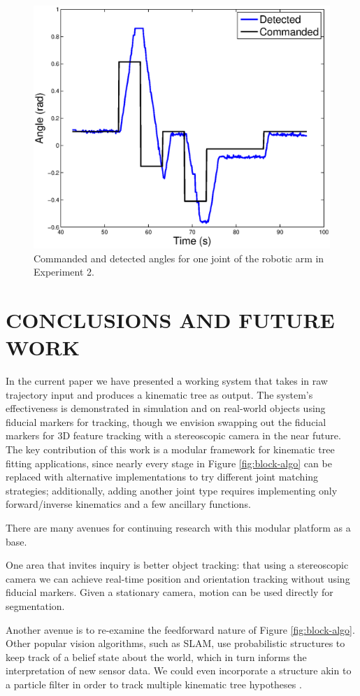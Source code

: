 \documentclass[letterpaper, 10 pt, conference]{ieeeconf}  %
\begin{document}
\begin{figure}[ht]
  \centering
  \includegraphics[width=.4\textwidth]{img/exp2b.eps}
  \vspace{-.1in}
  \caption{Commanded and detected angles for one joint of the robotic arm in Experiment 2.}
  \label{fig:exp2}
\end{figure}

\section{CONCLUSIONS AND FUTURE WORK} \label{sec:conclusion}\label{sec:future}

In the current paper we have presented a working system that takes in raw trajectory input and produces a kinematic tree as output. The system's effectiveness is demonstrated in simulation and on real-world objects using fiducial markers for tracking, though we envision swapping out the fiducial markers for 3D feature tracking with a stereoscopic camera in the near future. The key contribution of this work is a modular framework for kinematic tree fitting applications, since nearly every stage in Figure \ref{fig:block-algo} can be replaced with alternative implementations to try different joint matching strategies; additionally, adding another joint type requires implementing only forward/inverse kinematics and a few ancillary functions.

There are many avenues for continuing research with this modular platform as a base. 

One area that invites inquiry is better object tracking: that using a stereoscopic camera we can achieve real-time position and orientation tracking without using fiducial markers. Given a stationary camera, motion can be used directly for segmentation.

Another avenue is to re-examine the feedforward nature of Figure \ref{fig:block-algo}. Other popular vision algorithms, such as SLAM, use probabilistic structures to keep track of a belief state about the world, which in turn informs the interpretation of new sensor data. We could even incorporate a structure akin to a particle filter in order to track multiple kinematic tree hypotheses \cite{Thrun2002}.
\end{document}

